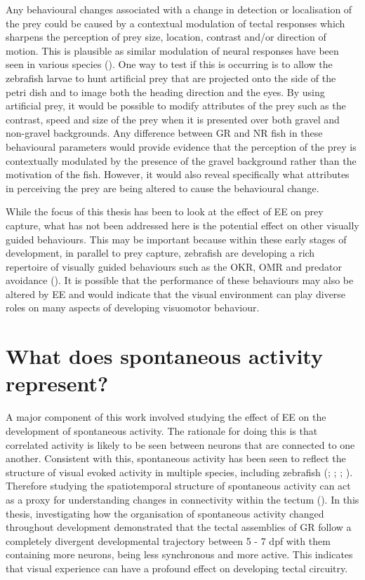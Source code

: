 Any behavioural changes associated with a change in detection or localisation of the prey could be caused by a contextual modulation of tectal responses which sharpens the perception of prey size, location, contrast and/or direction of motion.  This is plausible as similar modulation of neural responses have been seen in various species (\cite{Krause2014ContextualCortex, Sun2002ContextualPigeons, Sun2006ONRetina, Ziemba2018ContextualV2, Pecka2014Experience-DependentScenes}). One way to test if this is occurring is to allow the zebrafish larvae to hunt artificial prey that are projected onto the side of the petri dish and to image both the heading direction and the eyes. By using artificial prey, it would be possible to modify attributes of the prey such as the contrast, speed and size of the prey when it is presented over both gravel and non-gravel backgrounds. Any difference between GR and NR fish in these behavioural parameters would provide  evidence that the perception of the prey is contextually modulated by the presence of the gravel background rather than the motivation of the fish. However, it would also reveal specifically what attributes in perceiving the prey are being altered to cause the behavioural change.

While the focus of this thesis has been to look at the effect of EE on prey capture, what has not been addressed here is the potential effect on other visually guided behaviours. This may be important because within these early stages of development, in parallel to prey capture, zebrafish are developing a rich repertoire of visually guided behaviours such as the OKR, OMR and predator avoidance (\cite{Naumann2016FromResponse, Portugues2014, Dunn2016}). It is possible that the performance of these behaviours may also be altered by EE and would indicate that the visual environment can play diverse roles on many aspects of developing visuomotor behaviour. 

\section{What does spontaneous activity represent?}
A major component of this work involved studying the effect of EE on the development of spontaneous activity. The rationale for doing this is that correlated activity is likely to be seen between neurons that are connected to one another. Consistent with this, spontaneous activity has been seen to reflect the structure of visual evoked activity in multiple species, including zebrafish (\cite{Miller2014}; \cite{Romano2015}; \cite{Luczak2007}; \cite{Kenet2003}). Therefore studying the spatiotemporal structure of spontaneous activity can act as a proxy for understanding changes in connectivity within the tectum (\cite{Marachlian2018PrinciplesTectum}). In this thesis, investigating how the organisation of spontaneous activity changed throughout development demonstrated that the tectal assemblies of GR follow a completely divergent developmental trajectory between 5 - 7 dpf with them containing more neurons, being less synchronous and more active. This indicates that visual experience can have a profound effect on developing tectal circuitry. 

